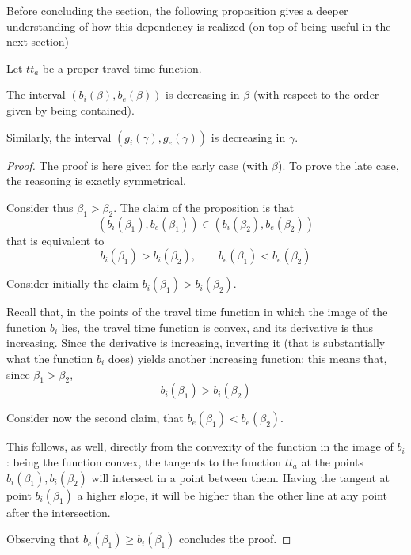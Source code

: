 Before concluding the section, the following proposition gives a deeper understanding of how this dependency is realized
(on top of being useful in the next section)
\begin{prop}
  \label{prop:monotonous_interv}
  Let \(tt_a\) be a proper travel time function.

  The interval \((b_i(\beta), b_e(\beta))\) is decreasing in \(\beta\) (with respect to the order given by being contained).

  Similarly, the interval \((g_i(\gamma), g_e(\gamma))\) is decreasing in \(\gamma\).
\end{prop}
\begin{proof}
  The proof is here given for the early case (with \(\beta\)).
  To prove the late case, the reasoning is exactly symmetrical.

  Consider thus \(\beta_1 > \beta_2\).
  The claim of the proposition is that
  \[(b_i(\beta_1), b_e(\beta_1)) \in (b_i(\beta_2), b_e(\beta_2))\]
  that is equivalent to
  \begin{equation*}
    b_i(\beta_1) > b_i(\beta_2),\qquad b_e(\beta_1) < b_e(\beta_2)
  \end{equation*}

  Consider initially the claim \(b_i(\beta_1) > b_i(\beta_2)\).

  Recall that,
  in the points of the travel time function in which the image of the function \(b_i\) lies,
  the travel time function is convex, and its derivative is thus increasing.
  Since the derivative is increasing, inverting it (that is substantially what the function \(b_i\) does) yields another increasing function:
  this means that, since \(\beta_1 > \beta_2\),
  \begin{equation*}
    b_i(\beta_1) > b_i(\beta_2)
  \end{equation*}

  Consider now the second claim, that \(b_e(\beta_1) < b_e(\beta_2)\).

  This follows, as well, directly from the convexity of the function in the image of \(b_i\):
  being the function convex,
  the tangents to the function \(tt_a\) at the points \(b_i(\beta_1), b_i(\beta_2)\) will intersect in a point between them.
  Having the tangent at point \(b_i(\beta_1)\) a higher slope,
  it will be higher than the other line at any point after the intersection.

  Observing that \(b_e(\beta_1) \geq b_i(\beta_1)\) concludes the proof.
\end{proof}

